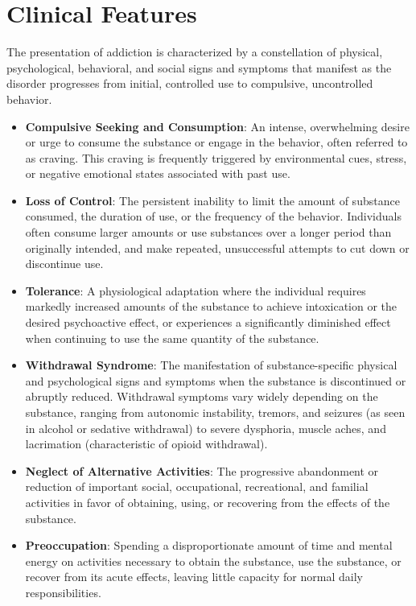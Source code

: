 \section*{Clinical Features}
The presentation of addiction is characterized by a constellation of physical, psychological, behavioral, and social signs and symptoms that manifest as the disorder progresses from initial, controlled use to compulsive, uncontrolled behavior.
\begin{itemize}
    \item \textbf{Compulsive Seeking and Consumption}: An intense, overwhelming desire or urge to consume the substance or engage in the behavior, often referred to as craving. This craving is frequently triggered by environmental cues, stress, or negative emotional states associated with past use.
    \item \textbf{Loss of Control}: The persistent inability to limit the amount of substance consumed, the duration of use, or the frequency of the behavior. Individuals often consume larger amounts or use substances over a longer period than originally intended, and make repeated, unsuccessful attempts to cut down or discontinue use.
    \item \textbf{Tolerance}: A physiological adaptation where the individual requires markedly increased amounts of the substance to achieve intoxication or the desired psychoactive effect, or experiences a significantly diminished effect when continuing to use the same quantity of the substance.
    \item \textbf{Withdrawal Syndrome}: The manifestation of substance-specific physical and psychological signs and symptoms when the substance is discontinued or abruptly reduced. Withdrawal symptoms vary widely depending on the substance, ranging from autonomic instability, tremors, and seizures (as seen in alcohol or sedative withdrawal) to severe dysphoria, muscle aches, and lacrimation (characteristic of opioid withdrawal).
    \item \textbf{Neglect of Alternative Activities}: The progressive abandonment or reduction of important social, occupational, recreational, and familial activities in favor of obtaining, using, or recovering from the effects of the substance.
    \item \textbf{Preoccupation}: Spending a disproportionate amount of time and mental energy on activities necessary to obtain the substance, use the substance, or recover from its acute effects, leaving little capacity for normal daily responsibilities.

\end{itemize}
